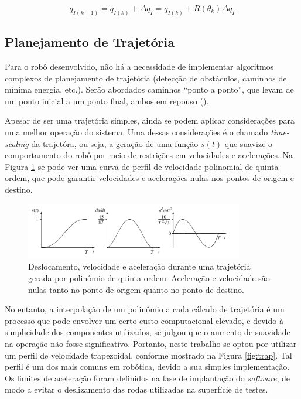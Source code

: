\begin{equation}
  q_{I(k+1)} = q_{I(k)} + \Delta q_I = q_{I(k)} + R(\theta_k) \Delta q_I
  \label{eq:new_odo}
\end{equation}

\subsection{Planejamento de Trajetória}

Para o robô desenvolvido, não há a necessidade de implementar algoritmos complexos de planejamento de trajetória (detecção de obstáculos, caminhos de mínima energia, etc.). Serão abordados caminhos ``ponto a ponto'', que levam de um ponto inicial a um ponto final, ambos em repouso (\cite{lynch2017modern}).

Apesar de ser uma trajetória simples, ainda se podem aplicar considerações para uma melhor operação do sistema. Uma dessas considerações é o chamado \textit{time-scaling} da trajetóra, ou seja, a geração de uma função $s(t)$ que suavize o comportamento do robô por meio de restrições em velocidades e acelerações. Na Figura \ref{fig:poly5} se pode ver uma curva de perfil de velocidade polinomial de quinta ordem, que pode garantir velocidades e acelerações nulas nos pontos de origem e destino.

\begin{figure}[h]
  \centering
  \includegraphics[width = 0.85\textwidth]{imagens/poly5}
  \caption{Deslocamento, velocidade e aceleração durante uma trajetória gerada por polinômio de quinta ordem. Aceleração e velocidade são nulas tanto no ponto de origem quanto no ponto de destino.}
  \label{fig:poly5}
\end{figure}

No entanto, a interpolação de um polinômio a cada cálculo de trajetória é um processo que pode envolver um certo custo computacional elevado, e devido à simplicidade dos componentes utilizados, se julgou que o aumento de suavidade na operação não fosse significativo. Portanto, neste trabalho se optou por utilizar um perfil de velocidade trapezoidal, conforme mostrado na Figura \ref{fig:trap}. Tal perfil é um dos mais comuns em robótica, devido a sua simples implementação. Os limites de aceleração foram definidos na fase de implantação do \textit{software}, de modo a evitar o deslizamento das rodas utilizadas na superfície de testes.


